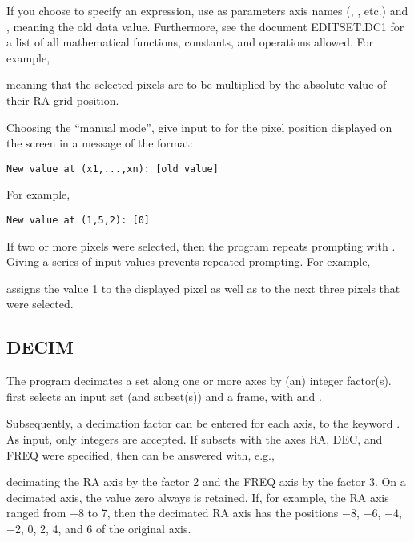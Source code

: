 If you choose to specify an expression, use as parameters axis names
(, , etc.) and , meaning the old
data value.  Furthermore, see the document EDITSET.DC1 for a list of all
mathematical functions, constants, and operations allowed.  For example,


meaning that the selected pixels are to be multiplied by the absolute
value of their RA grid position. 

Choosing the ``manual mode'', give input to  for the
pixel position displayed on the screen in a message of the format:

{\tt New value at (x1,...,xn):\hspace{4cm} [old value]}

For example,

{\tt New value at (1,5,2):\hspace{4cm} [0]}

If two or more pixels were selected, then the program repeats prompting
with .  Giving a series of input values prevents
repeated prompting.  For example,



assigns the value 1 to the displayed pixel as well as to the next three
pixels that were selected. 

\subsection*{DECIM}

The program  decimates a set along one or more axes by
(an) integer factor(s).   first selects an input set (and
subset(s)) and a frame, with  and . 

Subsequently, a decimation factor can be entered for each axis, to the
keyword .  As input, only integers are accepted.  If
subsets with the axes RA, DEC, and FREQ were specified, then
 can be answered with, e.g.,


decimating the RA axis by the factor 2 and the FREQ axis by the factor
3.  On a decimated axis, the value zero always is retained.  If, for
example, the RA axis ranged from $-$8 to 7, then the decimated RA axis
has the positions $-$8, $-$6, $-4$, $-$2, 0, 2, 4, and 6 of the original
axis. 


